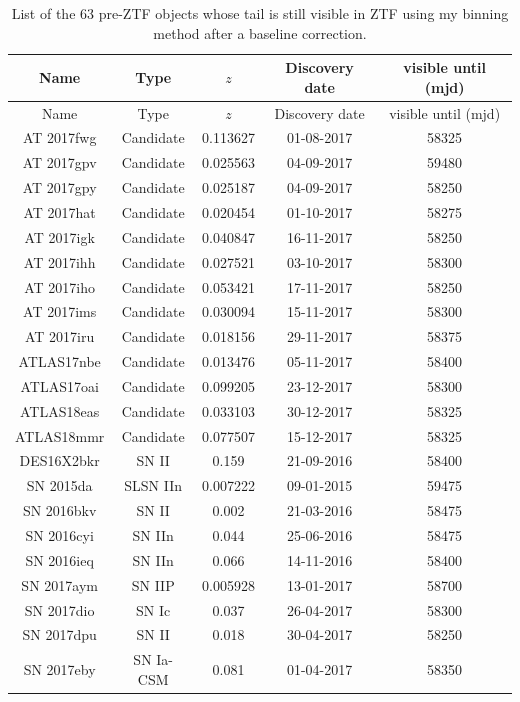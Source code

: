 \documentclass[a4paper,oneside,12pt, class=Latex/Classes/PhDthesisPSnPDF, crop=false]{standalone}
\begin{document}
\begin{longtable}{ccccc}
\caption{List of the 63 pre-ZTF objects whose tail is still visible in ZTF using my binning method after a baseline correction.}
 \label{tail_objects}
 \endfirsthead
 \hline
 \hline
 Name &  Type & $z$ & Discovery date & visible until (mjd) \\
 \hline
 \endhead
 \hline
 \endfoot
 \hline
 \endlastfoot
 \hline
 \hline
 Name &  Type & $z$ & Discovery date & visible until (mjd) \\
 \hline
 AT 2017fwg & Candidate & 0.113627 & 01-08-2017 & 58325 \\
 AT 2017gpv & Candidate &  0.025563 & 04-09-2017 & 59480\\
 AT 2017gpy & Candidate & 0.025187 & 04-09-2017 & 58250 \\
 AT 2017hat & Candidate & 0.020454 & 01-10-2017 & 58275 \\
 AT 2017igk & Candidate & 0.040847 & 16-11-2017 & 58250 \\
 AT 2017ihh & Candidate & 0.027521 & 03-10-2017 & 58300 \\
 AT 2017iho & Candidate & 0.053421 & 17-11-2017 & 58250 \\
 AT 2017ims & Candidate & 0.030094 & 15-11-2017 & 58300 \\
 AT 2017iru & Candidate & 0.018156 & 29-11-2017 & 58375 \\
 ATLAS17nbe & Candidate & 0.013476 & 05-11-2017 & 58400 \\
 ATLAS17oai & Candidate & 0.099205 & 23-12-2017 & 58300 \\
 ATLAS18eas & Candidate & 0.033103 & 30-12-2017 & 58325 \\
 ATLAS18mmr & Candidate & 0.077507 & 15-12-2017 & 58325 \\
 DES16X2bkr & SN II & 0.159 & 21-09-2016 & 58400 \\
 SN 2015da & SLSN IIn & 0.007222 & 09-01-2015 & 59475 \\
 SN 2016bkv & SN II & 0.002 & 21-03-2016 & 58475 \\
 SN 2016cyi & SN IIn & 0.044 & 25-06-2016 & 58475 \\
 SN 2016ieq & SN IIn & 0.066 & 14-11-2016 & 58400 \\
 SN 2017aym & SN IIP & 0.005928 & 13-01-2017 & 58700 \\
 SN 2017dio & SN Ic & 0.037 & 26-04-2017 & 58300 \\
 SN 2017dpu & SN II & 0.018 & 30-04-2017 & 58250 \\
 SN 2017eby & SN Ia-CSM & 0.081 & 01-04-2017 & 58350 \\

\end{longtable}
\end{document}
